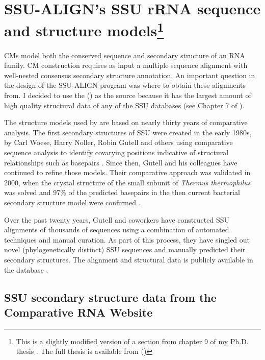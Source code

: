 \section[SSU-ALIGN's SSU rRNA sequence and structure models]{SSU-ALIGN's SSU rRNA sequence and structure
  models\footnote{This is a slightly modified version 
  of a section from chapter 9 of my Ph.D. thesis \cite{Nawrocki09b}.
  The full thesis is available from
  ()}}
\label{sec:models}

CMs model both the conserved sequence and secondary structure of an
RNA family. CM construction requires as input a multiple sequence
alignment with well-nested consensus secondary structure
annotation. An important question in the design of the SSU-ALIGN
program was where to obtain these alignments from. I decided to use
the  () \cite{CannoneGutell02} as
the source because it has the largest amount of high quality
structural data of any of the SSU databases (see
Chapter 7 of \cite{Nawrocki09b}).

The structure models used by  are based on nearly thirty years of
comparative analysis. The first secondary structures of SSU were
created in the early 1980s, by Carl Woese, Harry Noller, Robin Gutell
and others using comparative sequence analysis to identify covarying
positions indicative of structural relationships such as basepairs
\cite{Woese80,Noller81,Woese83}. Since then, Gutell and his
colleagues have continued to refine those models. Their comparative
approach was validated in 2000, when the crystal structure of the
small subunit of \emph{Thermus thermophilus} was solved
\cite{Wimberly00} and 97\% of the predicted basepairs in the then
current bacterial secondary structure model were confirmed
\cite{Gutell02}.

Over the past twenty years, Gutell and coworkers have constructed SSU
alignments of thousands of sequences using a combination of automated
techniques and manual curation. As part of this process, they have
singled out novel (phylogenetically distinct) SSU sequences and
manually predicted their secondary structures. The alignment and
structural data is publicly available in the  database
\cite{CannoneGutell02}. 

\subsection{SSU secondary structure data from the Comparative RNA
  Website} 

